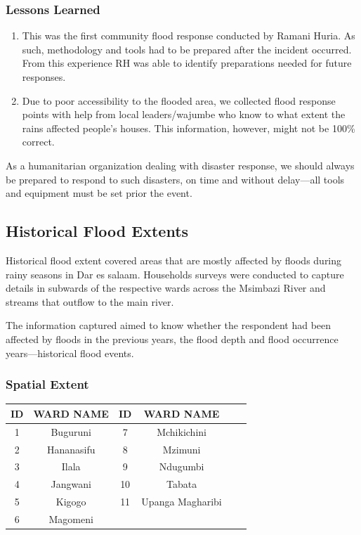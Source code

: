 \documentclass[a4paper,12pt,twoside]{article}
\begin{document}
\subsubsection{Lessons Learned}
\begin{enumerate}
    \item This was the first community flood response conducted by Ramani Huria. As such, methodology and tools had to be prepared after the incident occurred. From this experience RH was able to identify preparations needed for future responses.
    \item Due to poor accessibility to the flooded area, we collected flood response points with help from local leaders/wajumbe who know to what extent the rains affected people’s houses. This information, however, might not be 100\% correct.
\end{enumerate}

As a humanitarian organization dealing with disaster response, we should always be prepared to respond to such disasters, on time and without delay---all tools and equipment must be set prior the event.

\newpage
\subsection{Historical Flood Extents}
Historical flood extent covered areas that are mostly affected by floods during rainy seasons in Dar es salaam. Households surveys were conducted to capture details in  subwards of the respective wards across the Msimbazi River and streams that outflow to the main river.

The information captured aimed to know whether the respondent had been affected by floods in the previous years, the flood depth and flood occurrence years---historical flood events.


\subsubsection{Spatial Extent}

\begin{center}
\begin{tabular}{|c|c|c|c|c|c|}
\hline
ID & WARD NAME & ID & WARD NAME\\
\hline
1 & Buguruni & 7 & Mchikichini\\
2 & Hananasifu & 8 & Mzimuni\\
3 & Ilala & 9 & Ndugumbi\\
4 & Jangwani & 10 & Tabata\\
5 & Kigogo & 11 & Upanga Magharibi\\
6 &  Magomeni & {} & {} \\
 \hline
\end{tabular}
\end{center}
\end{document}
